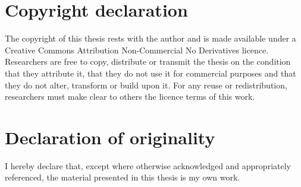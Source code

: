 \chapter*{Copyright declaration}

The copyright of this thesis rests with the author and is made available under a Creative Commons Attribution Non-Commercial No Derivatives licence.
Researchers are free to copy, distribute or transmit the thesis on the condition that they attribute it, that they do not use it for commercial purposes and that they do not alter, transform or build upon it.
For any reuse or redistribution, researchers must make clear to others the licence terms of this work.


{\let\clearpage\relax \chapter*{Declaration of originality}}

I hereby declare that, except where otherwise acknowledged and appropriately referenced, the material presented in this thesis is my own work.
